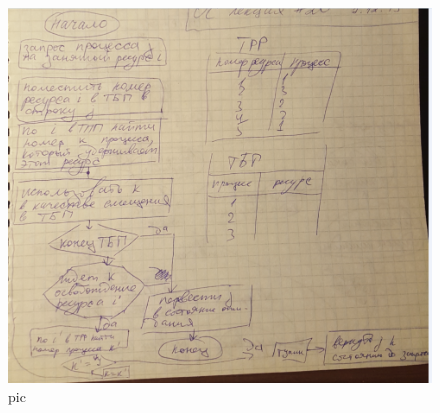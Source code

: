 \begin{figure}[H]
    \centering
    \includegraphics[width=\textwidth]{pic/1.png}
    \caption{pic}
\end{figure}


